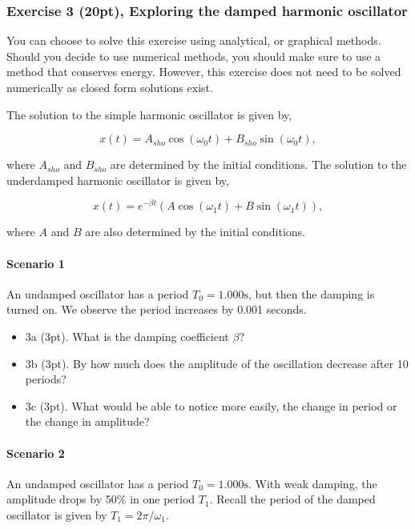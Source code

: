 \documentclass[11pt]{article}
\providecommand{\tightlist}{%
      \setlength{\itemsep}{0pt}\setlength{\parskip}{0pt}}
\begin{document}
    \subsubsection{Exercise 3 (20pt), Exploring the damped harmonic
oscillator}\label{exercise-3-20pt-exploring-the-damped-harmonic-oscillator}

You can choose to solve this exercise using analytical, or graphical
methods. Should you decide to use numerical methods, you should make
sure to use a method that conserves energy. However, this exercise does
not need to be solved numerically as closed form solutions exist.

The solution to the simple harmonic oscillator is given by,

\[x(t) = A_{sho}\cos(\omega_0 t) + B_{sho}\sin(\omega_0 t),\]

where \(A_{sho}\) and \(B_{sho}\) are determined by the initial
conditions. The solution to the underdamped harmonic oscillator is given
by,

\[x(t) = e^{-\beta t}\left(A\cos(\omega_1 t) + B\sin(\omega_1 t)\right),\]

where \(A\) and \(B\) are also determined by the initial conditions.

\paragraph{Scenario 1}\label{scenario-1}

An undamped oscillator has a period \(T_0 = 1.000\mathrm{s}\), but then
the damping is turned on. We observe the period increases by 0.001
seconds.

\begin{itemize}
\tightlist
\item
  3a (3pt). What is the damping coefficient \(\beta\)?
\item
  3b (3pt). By how much does the amplitude of the oscillation decrease
  after 10 periods?
\item
  3c (3pt). What would be able to notice more easily, the change in
  period or the change in amplitude?
\end{itemize}

\paragraph{Scenario 2}\label{scenario-2}

An undamped oscillator has a period \(T_0 = 1.000\mathrm{s}\). With weak
damping, the amplitude drops by 50\% in one period \(T_1\). Recall the
period of the damped oscillator is given by \(T_1 = 2\pi/\omega_1\).
\end{document}
